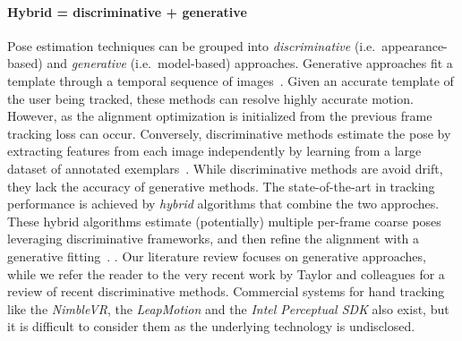 \paragraph{Hybrid = discriminative + generative }
Pose estimation techniques can be grouped into \emph{discriminative} (i.e.\ appearance-based) and \emph{generative} (i.e.\ model-based) approaches. 
Generative approaches fit a template through a temporal sequence of images~\cite{oiko2011hand,melax2013dynamics,schroder2014real,tagliasacchi2015robust}. Given an accurate template of the user being tracked, these methods can resolve highly accurate motion. However, as the alignment optimization is initialized from the previous frame tracking loss can occur. 
Conversely, discriminative methods estimate the pose by extracting features from each image independently by learning from a large dataset of annotated exemplars~\cite{keskin2012hand,tang2013real,tejani2014latent,sun2015cascaded}. While discriminative methods are avoid drift, they lack the accuracy of generative methods. 
The state-of-the-art in tracking performance is achieved by \emph{hybrid} algorithms that combine the two approches. These hybrid algorithms estimate (potentially) multiple per-frame coarse poses leveraging discriminative frameworks, and then refine the alignment with a generative fitting~\cite{tompson2014real,qian2014realtime,sharp2015accurate,sridhar2015fast}. 
.
Our literature review focuses on generative approaches, while we refer the reader to the very recent work by Taylor and colleagues  for a review of recent discriminative methods. Commercial systems for hand tracking like the \emph{NimbleVR\textcopyright}, the \emph{LeapMotion\textcopyright} and the \emph{Intel Perceptual SDK\textcopyright} also exist, but it is difficult to consider them as the underlying technology is undisclosed. 

